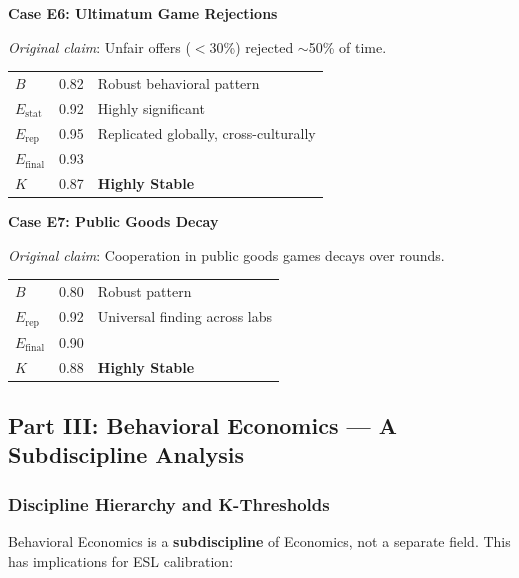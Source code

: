 \documentclass[11pt,a4paper]{article}
\begin{document}
\textbf{Case E6: Ultimatum Game Rejections}

\textit{Original claim}: Unfair offers ($<$30\%) rejected $\sim$50\% of time.

\begin{center}
\begin{tabular}{lcl}
\toprule
$B$ & 0.82 & Robust behavioral pattern \\
$E_{\text{stat}}$ & 0.92 & Highly significant \\
$E_{\text{rep}}$ & 0.95 & \textcolor{green!60!black}{Replicated globally, cross-culturally} \\
\midrule
$E_{\text{final}}$ & 0.93 & \\
$K$ & 0.87 & \textbf{Highly Stable} \\
\bottomrule
\end{tabular}
\end{center}

\textbf{Case E7: Public Goods Decay}

\textit{Original claim}: Cooperation in public goods games decays over rounds.

\begin{center}
\begin{tabular}{lcl}
\toprule
$B$ & 0.80 & Robust pattern \\
$E_{\text{rep}}$ & 0.92 & \textcolor{green!60!black}{Universal finding across labs} \\
\midrule
$E_{\text{final}}$ & 0.90 & \\
$K$ & 0.88 & \textbf{Highly Stable} \\
\bottomrule
\end{tabular}
\end{center}

\subsection{Part III: Behavioral Economics --- A Subdiscipline Analysis}

\subsubsection{Discipline Hierarchy and K-Thresholds}

Behavioral Economics is a \textbf{subdiscipline} of Economics, not a separate field. This has implications for ESL calibration:
\end{document}
